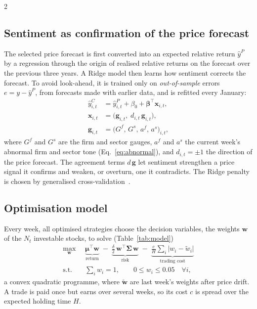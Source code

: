 \begin{multicols}{2}

\subsection{Sentiment as confirmation of the price forecast}
The selected price forecast is first converted into an expected relative return $\hat y^{P}$ by a regression through the origin of realised relative returns on the forecast over the previous three years. A Ridge model then learns how sentiment corrects the forecast. To avoid look-ahead, it is trained only on \emph{out-of-sample} errors $e = y - \hat y^{P}$, from forecasts made with earlier data, and is refitted every January:
\begin{equation}\label{eq:correction}
\begin{aligned}
\hat y^{C}_{i,t} &= \hat y^{P}_{i,t} + \beta_0 + \boldsymbol\beta^{\top} \mathbf x_{i,t} ,\\[2pt]
\mathbf x_{i,t} &= \bigl(\mathbf g_{i,t} ,\; d_{i,t}\, \mathbf g_{i,t}\bigr) ,\\[2pt]
\mathbf g_{i,t} &= \bigl(G^{f} ,\, G^{s} ,\, a^{f} ,\, a^{s}\bigr)_{i,t} ,
\end{aligned}
\end{equation}
where $G^{f}$ and $G^{s}$ are the firm and sector gauges, $a^{f}$ and $a^{s}$ the current week's abnormal firm and sector tone (Eq.~\ref{eq:abnormal}), and $d_{i,t} = \pm 1$ the direction of the price forecast. The agreement terms $d\,\mathbf g$ let sentiment strengthen a price signal it confirms and weaken, or overturn, one it contradicts. The Ridge penalty is chosen by generalised cross-validation~\cite{hoerl}.

\subsection{Optimisation model}\label{sec:model}
Every week, all optimised strategies choose the decision variables, the weights $\mathbf w$ of the $N_t$ investable stocks, to solve (Table~\ref{tab:model})
\begin{equation}\label{eq:optimiser}
\begin{aligned}
\max_{\mathbf w}\;\; &\underbrace{\boldsymbol\mu^{\top} \mathbf w}_{\text{return}} \;-\; \underbrace{\frac{\delta}{2}\, \mathbf w^{\top} \boldsymbol\Sigma\, \mathbf w}_{\text{risk}} \;-\; \underbrace{\frac{c}{H} \sum_i \lvert w_i - \tilde w_i \rvert}_{\text{trading cost}}\\[4pt]
\text{s.t.}\;\; &\textstyle\sum_i w_i = 1 , \qquad 0 \le w_i \le 0.05 \quad \forall i ,
\end{aligned}
\end{equation}
a convex quadratic programme, where $\tilde{\mathbf w}$ are last week's weights after price drift. A trade is paid once but earns over several weeks, so its cost $c$ is spread over the expected holding time $H$.


\end{multicols}
